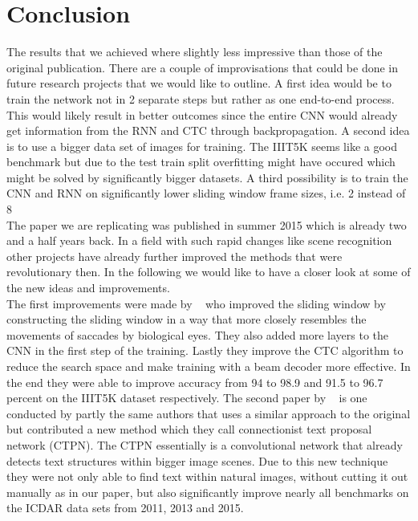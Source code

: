 \documentclass{utue} %
\begin{document}
\section{Conclusion}
The results that we achieved where slightly less impressive than those of the original publication. There are a couple of improvisations that could be done in future research projects that we would like to outline. A first idea would be to train the network not in 2 separate steps but rather as one end-to-end process. This would likely result in better outcomes since the entire CNN would already get information from the RNN and CTC through backpropagation. A second idea is to use a bigger data set of images for training. The IIIT5K seems like a good benchmark but due to the test train split overfitting might have occured which might be solved by significantly bigger datasets. A third possibility is to train the CNN and RNN on significantly lower sliding window frame sizes, i.e. 2 instead of 8 %
\\
The paper we are replicating was published in summer 2015 which is already two and a half years back. In a field with such rapid changes like scene recognition other projects have already further improved the methods that were revolutionary then. In the following we would like to have a closer look at some of the new ideas and improvements. \\
The first improvements were made by ~\cite{DBLP:journals/corr/abs-1709-01727} who improved the sliding window by constructing the sliding window in a way that more closely resembles the movements of saccades by biological eyes. They also added more layers to the CNN in the first step of the training. Lastly they improve the CTC algorithm to reduce the search space and make training with a beam decoder more effective. In the end they were able to improve accuracy from 94 to 98.9 and 91.5 to 96.7 percent on the IIIT5K dataset respectively. 
The second paper by ~\cite{DBLP:journals/corr/TianHHH016} is one conducted by partly the same authors that uses a similar approach to the original but contributed a new method which they call connectionist text proposal network (CTPN). The CTPN essentially is a convolutional network that already detects text structures within bigger image scenes. Due to this new technique they were not only able to find text within natural images, without cutting it out manually as in our paper, but also significantly improve nearly all benchmarks on the ICDAR data sets from 2011, 2013 and 2015.
\end{document}
